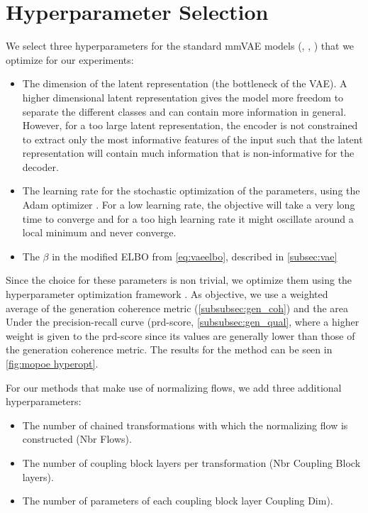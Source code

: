 

\section{Hyperparameter Selection}
\label{sec:Hyperparameter Selection}
We select three hyperparameters for the standard mmVAE models (, , ) that we optimize for our experiments:

\begin{itemize}
    \item The dimension of the latent representation (the bottleneck of the VAE).
    A higher dimensional latent representation gives the model more freedom to separate the different classes and can contain more information in general.
    However, for a too large latent representation, the encoder is not constrained to extract only the most informative features of the input such that the latent representation will contain much information that is non-informative for the decoder.
    \item The learning rate for the stochastic optimization of the parameters, using the Adam optimizer \citep{kingma_adam_2017}.
    For a low learning rate, the objective will take a very long time to converge and for a too high learning rate it might oscillate around a local minimum and never converge.
    \item The $\beta$ in the modified ELBO from \cref{eq:vaeelbo}, described in \cref{subsec:vae}
\end{itemize}

Since the choice for these parameters is non trivial, we optimize them using the hyperparameter optimization framework  \citep{akiba_optuna_2019}.
As objective, we use a weighted average of the generation coherence metric (\cref{subsubsec:gen_coh}) and the area Under the precision-recall curve (prd-score, \cref{subsubsec:gen_qual}, where a higher weight is given to the prd-score since its values are generally lower than those of the generation coherence metric.
The results for the  method can be seen in \cref{fig:mopoe hyperopt}.

For our methods that make use of normalizing flows, we add three additional hyperparameters:
\begin{itemize}
    \item The number of chained transformations with which the normalizing flow is constructed (Nbr Flows).
    \item The number of coupling block layers per transformation (Nbr Coupling Block layers).
    \item The number of parameters of each coupling block layer Coupling Dim).
\end{itemize}

